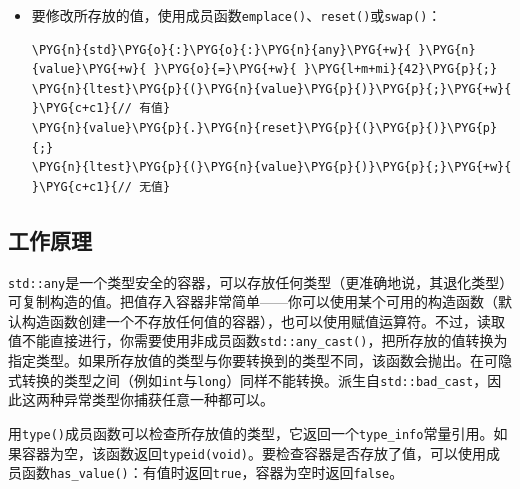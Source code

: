 \begin{itemize}

\item 要修改所存放的值，使用成员函数\texttt{emplace()}、\texttt{reset()}或\texttt{swap()}：



\begin{codeblockbg}
\begin{Verbatim}[commandchars=\\\{\},breaklines=true,breakanywhere=true,fontsize=\codefont,xleftmargin=17bp]
\PYG{n}{std}\PYG{o}{:}\PYG{o}{:}\PYG{n}{any}\PYG{+w}{ }\PYG{n}{value}\PYG{+w}{ }\PYG{o}{=}\PYG{+w}{ }\PYG{l+m+mi}{42}\PYG{p}{;}
\PYG{n}{ltest}\PYG{p}{(}\PYG{n}{value}\PYG{p}{)}\PYG{p}{;}\PYG{+w}{ }\PYG{c+c1}{// 有值}
\PYG{n}{value}\PYG{p}{.}\PYG{n}{reset}\PYG{p}{(}\PYG{p}{)}\PYG{p}{;}
\PYG{n}{ltest}\PYG{p}{(}\PYG{n}{value}\PYG{p}{)}\PYG{p}{;}\PYG{+w}{ }\PYG{c+c1}{// 无值}
\end{Verbatim}
\end{codeblockbg}

\end{itemize}



\subsection{工作原理}



\texttt{std::\allowbreak{}any}是一个类型安全的容器，可以存放任何类型（更准确地说，其退化类型）可复制构造的值。把值存入容器非常简单——你可以使用某个可用的构造函数（默认构造函数创建一个不存放任何值的容器），也可以使用赋值运算符。不过，读取值不能直接进行，你需要使用非成员函数\texttt{std::\allowbreak{}any\_\allowbreak{}cast()}，把所存放的值转换为指定类型。如果所存放值的类型与你要转换到的类型不同，该函数会抛出。在可隐式转换的类型之间（例如\texttt{int}与\texttt{long}）同样不能转换。派生自\texttt{std::\allowbreak{}bad\_\allowbreak{}cast}，因此这两种异常类型你捕获任意一种都可以。



用\texttt{type()}成员函数可以检查所存放值的类型，它返回一个\texttt{type\_\allowbreak{}info}常量引用。如果容器为空，该函数返回\texttt{typeid(\allowbreak{}void)}。要检查容器是否存放了值，可以使用成员函数\texttt{has\_\allowbreak{}value()}：有值时返回\texttt{true}，容器为空时返回\texttt{false}。


